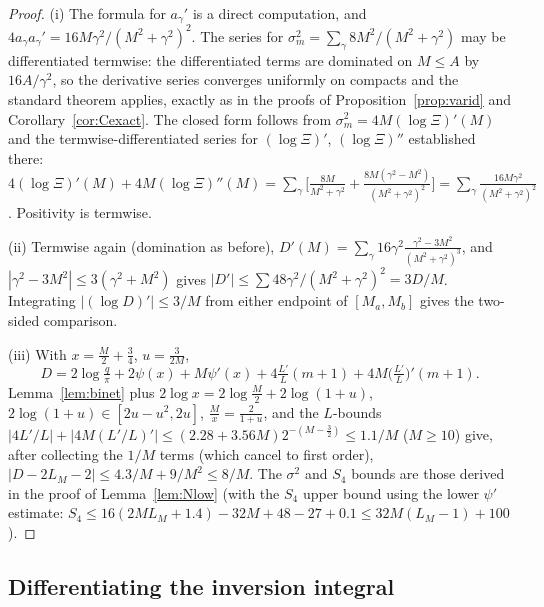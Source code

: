 \begin{proof}
(i) The formula for $a_\gamma'$ is a direct computation, and
$4a_\gamma a_\gamma'=16M\gamma^2/(M^2+\gamma^2)^2$. The series for
$\sigma_m^2=\sum_\gamma8M^2/(M^2+\gamma^2)$ may be differentiated
termwise: the differentiated terms are dominated on $M\le A$ by
$16A/\gamma^2$, so the derivative series converges uniformly on
compacts and the standard theorem applies, exactly as in the proofs of
Proposition~\ref{prop:varid} and Corollary~\ref{cor:Cexact}. The
closed form follows from
$\sigma_m^2=4M(\log\Xi)'(M)$ and the termwise-differentiated series
for $(\log\Xi)'$, $(\log\Xi)''$ established there:
$4(\log\Xi)'(M)+4M(\log\Xi)''(M)
=\sum_\gamma\bigl[\tfrac{8M}{M^2+\gamma^2}
+\tfrac{8M(\gamma^2-M^2)}{(M^2+\gamma^2)^2}\bigr]
=\sum_\gamma\tfrac{16M\gamma^2}{(M^2+\gamma^2)^2}$. Positivity is
termwise.

(ii) Termwise again (domination as before),
$D'(M)=\sum_\gamma16\gamma^2\frac{\gamma^2-3M^2}{(M^2+\gamma^2)^3}$,
and $|\gamma^2-3M^2|\le3(\gamma^2+M^2)$ gives
$|D'|\le\sum48\gamma^2/(M^2+\gamma^2)^2=3D/M$. Integrating
$|(\log D)'|\le3/M$ from either endpoint of $[M_a,M_b]$ gives the
two-sided comparison.

(iii) With $x=\tfrac M2+\tfrac34$, $u=\tfrac3{2M}$,
\[
D=2\log\tfrac q\pi+2\psi(x)+M\psi'(x)
+4\tfrac{L'}{L}(m+1)+4M\bigl(\tfrac{L'}{L}\bigr)'(m+1) .
\]
Lemma~\ref{lem:binet} plus $2\log x=2\log\tfrac M2+2\log(1+u)$,
$2\log(1+u)\in[2u-u^2,2u]$, $\tfrac Mx=\tfrac2{1+u}$, and the
$L$-bounds $|4L'/L|+|4M(L'/L)'|\le(2.28+3.56M)2^{-(M-\frac32)}
\le1.1/M$ ($M\ge10$) give, after collecting the $1/M$ terms (which
cancel to first order),
$|D-2L_M-2|\le4.3/M+9/M^2\le8/M$. The $\sigma^2$ and $S_4$ bounds are
those derived in the proof of Lemma~\ref{lem:Nlow} (with the $S_4$
upper bound using the lower $\psi'$ estimate:
$S_4\le16(2ML_M+1.4)-32M+48-27+0.1\le32M(L_M-1)+100$).
\end{proof}

\subsection*{Differentiating the inversion integral}

